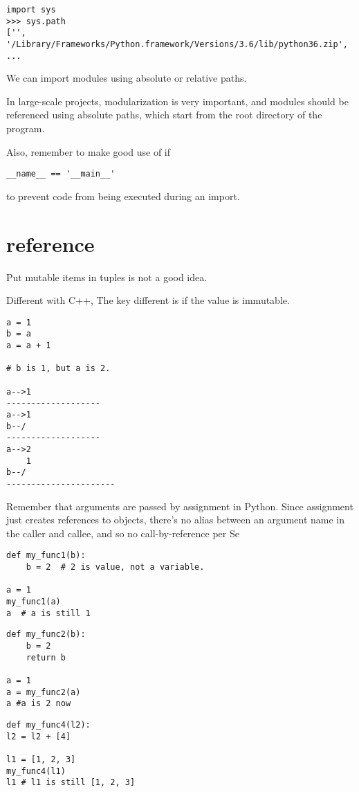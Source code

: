 \documentclass[a4paper,12pt,twoside]{book}
\begin{document}
\begin{lstlisting}
import sys
>>> sys.path
['', '/Library/Frameworks/Python.framework/Versions/3.6/lib/python36.zip', ...
\end{lstlisting}

We can import modules using absolute or relative paths. 

In large-scale projects, modularization is very important, and modules should be referenced using absolute paths, which start from the root directory of the program.

Also, remember to make good use of if
\begin{lstlisting}
__name__ == '__main__' 
\end{lstlisting}
to prevent code from being executed during an import.

\section{reference}

Put mutable items in tuples is not a good idea.

Different with C++, The key different is if the value is immutable.
\begin{lstlisting}
a = 1
b = a
a = a + 1

# b is 1, but a is 2. 

a-->1
-------------------
a-->1
b--/
-------------------
a-->2
    1
b--/
----------------------
\end{lstlisting}

Remember that arguments are passed by assignment in Python. Since assignment just creates references to objects, there’s no alias between an argument name in the caller and callee, and so no call-by-reference per Se
\begin{lstlisting}
def my_func1(b):
	b = 2  # 2 is value, not a variable.

a = 1
my_func1(a)
a  # a is still 1
\end{lstlisting}

\begin{lstlisting}
def my_func2(b):
	b = 2
	return b

a = 1
a = my_func2(a)
a #a is 2 now
\end{lstlisting}

\begin{lstlisting}
def my_func4(l2):
l2 = l2 + [4]

l1 = [1, 2, 3]
my_func4(l1)
l1 # l1 is still [1, 2, 3]
\end{lstlisting}
\end{document}
